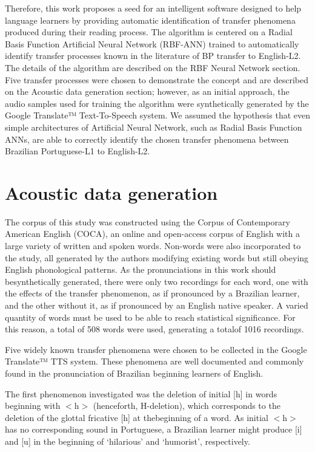 Therefore, this work proposes a seed for an intelligent software designed to
help language learners by providing automatic identification of transfer
phenomena produced during their reading process. The algorithm is centered on a
Radial Basis Function Artificial Neural Network (RBF-ANN) trained to
automatically identify transfer processes known in the literature of BP
transfer to English-L2. The details of the algorithm are described on the RBF
Neural Network section. Five transfer processes were chosen to demonstrate the
concept and are described on the Acoustic data generation section; however, as
an initial approach, the audio samples used for training the algorithm were
synthetically generated by the Google Translate™ Text-To-Speech system. We
assumed the hypothesis that even simple architectures of Artificial Neural
Network, such as Radial Basis Function ANNs, are able to correctly identify the
chosen transfer phenomena between Brazilian Portuguese-L1 to English-L2.

\section{Acoustic data generation}
The corpus of this study was constructed using the Corpus of Contemporary
American English (COCA), an online and open-access corpus of English with a
large variety of written and spoken words. Non-words were also incorporated to
the study, all generated by the authors modifying existing words but still
obeying English phonological patterns. As the pronunciations in this work
should besynthetically generated, there were only two recordings for each word,
one with the effects of the transfer phenomenon, as if pronounced by a
Brazilian learner, and the other without it, as if pronounced by an English
native speaker. A varied quantity of words must be used to be able to reach
statistical significance. For this reason, a total of 508 words were used,
generating a totalof 1016 recordings.

Five widely known transfer phenomena were chosen to be collected in the Google
Translate™ TTS system. These phenomena are well documented and commonly found
in the pronunciation of Brazilian beginning learners of English.

The first phenomenon investigated was the deletion of initial [h] in words
beginning with $<$h$>$ (henceforth, H-deletion), which corresponds to the
deletion of the glottal fricative [h] at thebeginning of a word. As initial
$<$h$>$ has no corresponding sound in Portuguese, a Brazilian learner might
produce [i] and [u] in the beginning of ‘hilarious’ and ‘humorist’,
respectively.

